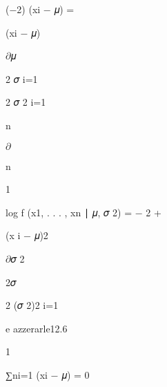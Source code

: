 \documentclass[a4paper,portrait,12pt]{article}
\begin{document}
\begin{flushleft}
($-$2) (xi $-$ 𝜇) =
\end{flushleft}


\begin{flushleft}
(xi $-$ 𝜇)
\end{flushleft}


\begin{flushleft}
$\partial$𝜇
\end{flushleft}


\begin{flushleft}
2 𝜎 i=1
\end{flushleft}


\begin{flushleft}
2 𝜎 2 i=1
\end{flushleft}


\begin{flushleft}
n
\end{flushleft}





$\partial$


\begin{flushleft}
n
\end{flushleft}


1


\begin{flushleft}
log f (x1, . . . , xn ∣ 𝜇, 𝜎 2) = $-$ 2 +
\end{flushleft}


\begin{flushleft}
(x i $-$ 𝜇)2
\end{flushleft}


\begin{flushleft}
$\partial$𝜎 2
\end{flushleft}


\begin{flushleft}
2𝜎
\end{flushleft}


\begin{flushleft}
2 (𝜎 2)2 i=1
\end{flushleft}


\begin{flushleft}
e azzerarle12.6
\end{flushleft}





1


\begin{flushleft}
∑ni=1 (xi $-$ 𝜇) = 0
\end{flushleft}
\end{document}
